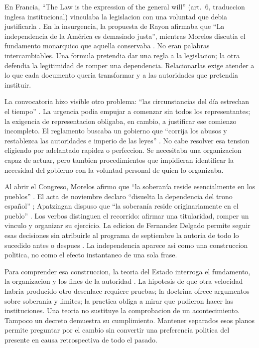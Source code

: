 \documentclass[spanish,letterpaper,oneside]{article}
\begin{document}
En Francia, ``The Law is the expression of the general will''
(art.~6, traduccion inglesa institucional) vinculaba la legislacion
con una voluntad que debia justificarla \citep{francia1789}.
En la insurgencia, la propuesta de Rayon afirmaba que ``La independencia
de la América es demasiado justa'', mientras Morelos discutia el
fundamento monarquico que aquella conservaba
\citep[pp.~49--54]{rayon2021,morelosObservaciones2021}.
No eran palabras intercambiables. Una formula pretendia dar una regla
a la legislacion; la otra defendia la legitimidad de romper una
dependencia. Relacionarlas exige atender a lo que cada documento
queria transformar y a las autoridades que pretendia instituir.

La convocatoria hizo visible otro problema: ``las circunstancias del
día estrechan el tiempo'' \citep[p.~69]{morelosConvocatoria2021}.
La urgencia podia empujar a comenzar sin todos los representantes;
la exigencia de representacion obligaba, en cambio, a justificar
ese comienzo incompleto. El reglamento buscaba un gobierno que
``corrija los abusos y restablezca las autoridades e imperio de las
leyes'' \citep[p.~71]{morelosReglamento2021}. No cabe resolver esa
tension eligiendo por adelantado rapidez o perfeccion. Se necesitaba
una organizacion capaz de actuar, pero tambien procedimientos que
impidieran identificar la necesidad del gobierno con la voluntad
personal de quien lo organizaba.

Al abrir el Congreso, Morelos afirmo que ``la soberanía reside
esencialmente en los pueblos'' \citep[p.~78]{morelosDiscurso2021}.
El acta de noviembre declaro ``disuelta la dependencia del trono
español'' \citep[p.~95]{congresoActa2021}; Apatzingan dispuso que
``la soberanía reside originariamente en el pueblo''
\citep[art.~5, p.~104]{congresoApatzingan2021}. Los verbos distinguen
el recorrido: afirmar una titularidad, romper un vinculo y organizar
su ejercicio. La edicion de Fernandez Delgado permite seguir esas
decisiones sin atribuirle al programa de septiembre la autoria de
todo lo sucedido antes o despues \citep[pp.~12--19]{fernandez2021}.
La independencia aparece asi como una construccion politica,
no como el efecto instantaneo de una sola frase.

Para comprender esa construccion, la teoria del Estado interroga
el fundamento, la organizacion y los fines de la autoridad
\citep{andrade2003}. La hipotesis de que otra velocidad habria
producido otro desenlace requiere pruebas; la doctrina ofrece
argumentos sobre soberania y limites; la practica obliga a mirar
que pudieron hacer las instituciones. Una teoria no sustituye
la comprobacion de un acontecimiento. Tampoco un decreto demuestra
su cumplimiento. Mantener separados esos planos permite preguntar
por el cambio sin convertir una preferencia politica del presente
en causa retrospectiva de todo el pasado.
\end{document}
